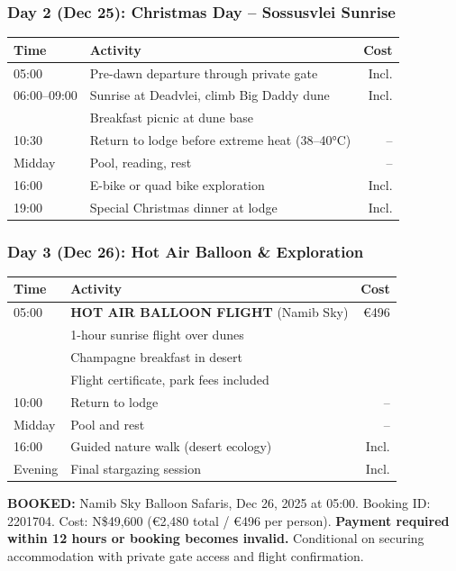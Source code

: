 \documentclass[11pt]{article}
\begin{document}
\subsubsection{Day 2 (Dec 25): Christmas Day -- Sossusvlei Sunrise}

\begin{tabular}{llr}
\toprule
\textbf{Time} & \textbf{Activity} & \textbf{Cost} \\
\midrule
05:00 & Pre-dawn departure through private gate & Incl. \\
06:00--09:00 & Sunrise at Deadvlei, climb Big Daddy dune & Incl. \\
& Breakfast picnic at dune base & \\
10:30 & Return to lodge before extreme heat (38--40°C) & -- \\
Midday & Pool, reading, rest & -- \\
16:00 & E-bike or quad bike exploration & Incl. \\
19:00 & Special Christmas dinner at lodge & Incl. \\
\bottomrule
\end{tabular}

\subsubsection{Day 3 (Dec 26): Hot Air Balloon \& Exploration}

\begin{tabular}{llr}
\toprule
\textbf{Time} & \textbf{Activity} & \textbf{Cost} \\
\midrule
05:00 & \textbf{HOT AIR BALLOON FLIGHT} (Namib Sky) & €496 \\
& 1-hour sunrise flight over dunes & \\
& Champagne breakfast in desert & \\
& Flight certificate, park fees included & \\
10:00 & Return to lodge & -- \\
Midday & Pool and rest & -- \\
16:00 & Guided nature walk (desert ecology) & Incl. \\
Evening & Final stargazing session & Incl. \\
\bottomrule
\end{tabular}

\textcolor{accentcolor}{\textbf{BOOKED:}} Namib Sky Balloon Safaris, Dec 26, 2025 at 05:00. Booking ID: 2201704. Cost: N\$49,600 (€2,480 total / €496 per person). \textcolor{warningcolor}{\textbf{Payment required within 12 hours or booking becomes invalid.}} Conditional on securing accommodation with private gate access and flight confirmation.
\end{document}
